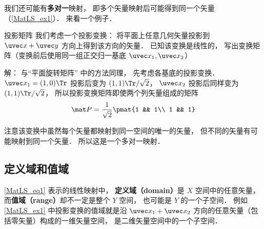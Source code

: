 我们还可能有\textbf{多对一}映射， 即多个矢量映射后可能得到同一个矢量（\autoref{MatLS_ex1}）． 来看一个例子．

\begin{example}{投影矩阵}\label{MatLS_ex1}
我们考虑一个投影变换： 将平面上任意几何矢量投影到 $\uvec x + \uvec y$ 方向上得到该方向的矢量． 已知该变换是线性的， 写出变换矩阵（变换前后使用同一组正交归一基底 $\uvec x_1, \uvec x_2$）

解： 与“平面旋转矩阵” 中的方法同理， 先考虑各基底的投影变换． $\uvec x_1 = (1, 0)\Tr$ 投影后变为 $(1, 1)\Tr /\sqrt2$， $\uvec x_2$ 投影后同样变为 $(1, 1)\Tr /\sqrt2$， 所以投影变换矩阵即使两个列矢量组成的矩阵
\begin{equation}
\mat P = \frac{1}{\sqrt{2}} \pmat{1 && 1\\ 1 && 1}
\end{equation}

注意该变换中虽然每个矢量都映射到同一空间的唯一的矢量， 但不同的矢量有可能映射到同一个矢量． 所以这是一个多对一映射．
\end{example}

\subsection{定义域和值域}
\autoref{MatLS_eq1} 表示的线性映射中， \textbf{定义域（domain）}是 $X$ 空间中的任意矢量， 而\textbf{值域（range）}却不一定是整个 $Y$ 空间， 也可能是 $Y$ 的一个子空间． 例如\autoref{MatLS_ex1} 中投影变换的值域就是沿 $\uvec x_1 + \uvec x_2$ 方向的任意矢量（包括零矢量）构成的一维矢量空间， 是二维矢量空间中的一个子空间．


